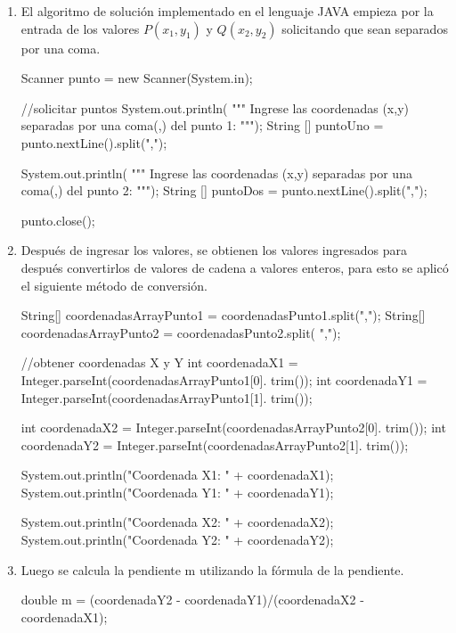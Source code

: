 \begin{enumerate}
    \item El algoritmo de solución implementado en el lenguaje JAVA empieza por la entrada de los valores $P(x_{1},y_{1})$ y $Q(x_{2},y_{2})$ solicitando que sean separados por una coma.
    \begin{javaCode}
    Scanner punto = new Scanner(System.in);
            
    //solicitar puntos
    System.out.println(
    """
    Ingrese las coordenadas (x,y) separadas 
    por una coma(,) del punto 1:
    """);
    String [] puntoUno = punto.nextLine().split(",");
            
    System.out.println(
    """
    Ingrese las coordenadas (x,y) separadas 
    por una coma(,) del punto 2: """);
    String [] puntoDos = punto.nextLine().split(",");
            
    punto.close();
    \end{javaCode}

    \item Después de ingresar los valores, se obtienen los valores ingresados para después convertirlos de valores de cadena a valores enteros, para esto se aplicó el siguiente método de conversión.

    \begin{javaCode}
    String[] coordenadasArrayPunto1 = coordenadasPunto1.split(",");
    String[] coordenadasArrayPunto2 = coordenadasPunto2.split( ",");
            
    //obtener coordenadas X y Y
    int coordenadaX1 = Integer.parseInt(coordenadasArrayPunto1[0].
    trim());
    int coordenadaY1 = Integer.parseInt(coordenadasArrayPunto1[1].
    trim());
            
    int coordenadaX2 = Integer.parseInt(coordenadasArrayPunto2[0].
    trim());
    int coordenadaY2 = Integer.parseInt(coordenadasArrayPunto2[1].
    trim());
            
    System.out.println("Coordenada X1: " + coordenadaX1);
    System.out.println("Coordenada Y1: " + coordenadaY1);
            
    System.out.println("Coordenada X2: " + coordenadaX2);
    System.out.println("Coordenada Y2: " + coordenadaY2);
    \end{javaCode}

    \item Luego se calcula la pendiente m utilizando la fórmula de la pendiente\cite{articuloRecta}.

    \begin{javaCode}
        double m = (coordenadaY2 - coordenadaY1)/(coordenadaX2 - coordenadaX1);
    \end{javaCode}


\end{enumerate}
